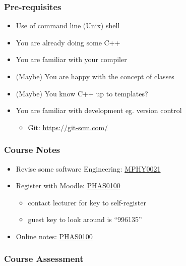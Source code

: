 \subsubsection{Pre-requisites}\label{pre-requisites}

\begin{itemize}
\itemsep1pt\parskip0pt
\item
  Use of command line (Unix) shell
\item
  You are already doing some C++
\item
  You are familiar with your compiler
\item
  (Maybe) You are happy with the concept of classes
\item
  (Maybe) You know C++ up to templates?
\item
  You are familiar with development eg. version control

  \begin{itemize}
  \itemsep1pt\parskip0pt
  \item
    Git: \url{https://git-scm.com/}
  \end{itemize}
\end{itemize}

\subsubsection{Course Notes}\label{course-notes}

\begin{itemize}
\itemsep1pt\parskip0pt
\item
  Revise some software Engineering:
  \href{http://github-pages.ucl.ac.uk/rsd-engineeringcourse/}{MPHY0021}
\item
  Register with Moodle: \href{https://moodle.ucl.ac.uk/}{PHAS0100}

  \begin{itemize}
  \itemsep1pt\parskip0pt
  \item
    contact lecturer for key to self-register
  \item
    guest key to look around is ``996135''
  \end{itemize}
\item
  Online notes:
  \href{http://rits.github-pages.ucl.ac.uk/research-computing-with-cpp/}{PHAS0100}
\end{itemize}

\subsubsection{Course Assessment}\label{course-assessment}

